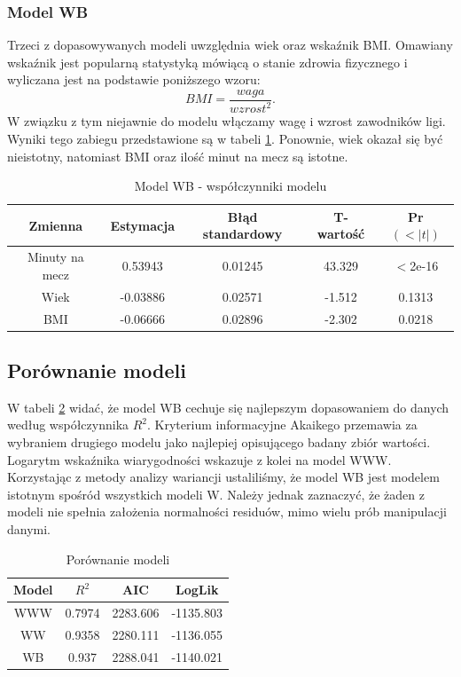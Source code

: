 \documentclass[11pt,a4paper]{article}
\begin{document}
\subsubsection{Model WB}
Trzeci z dopasowywanych modeli uwzględnia wiek oraz wskaźnik BMI. Omawiany wskaźnik jest popularną statystyką mówiącą o stanie zdrowia fizycznego i wyliczana jest na podstawie poniższego wzoru:
\begin{equation}
BMI = \frac{waga}{wzrost^2}.
\end{equation}
W związku z tym niejawnie do modelu włączamy wagę i wzrost zawodników ligi. Wyniki tego zabiegu przedstawione są w tabeli \ref{model_wb}. Ponownie, wiek okazał się być nieistotny, natomiast BMI oraz ilość minut na mecz są istotne.
\begin{table}[H]
	\begin{tabular}{| c | c | c | c | c |}
		\hline
		Zmienna & Estymacja & Błąd standardowy & T-wartość & Pr$(<|t|)$\\ \hline
		Minuty na mecz & 0.53943 & 0.01245 & 43.329 & $<$2e-16\\ \hline
		Wiek & -0.03886 & 0.02571 & -1.512 & 0.1313\\ \hline 
		BMI & -0.06666 & 0.02896 & -2.302 &  0.0218\\ \hline 	
	\end{tabular}
	\caption{Model WB - współczynniki modelu}
	\label{model_wb}
\end{table}
\subsection{Porównanie modeli}
W tabeli \ref{porownanie_modeli_w} widać, że model WB cechuje się najlepszym dopasowaniem do danych według współczynnika $R^2$. Kryterium informacyjne Akaikego przemawia za wybraniem drugiego modelu jako najlepiej opisującego badany zbiór wartości. Logarytm wskaźnika wiarygodności wskazuje z kolei na model WWW. Korzystając z metody analizy wariancji ustaliliśmy, że model WB jest modelem istotnym spośród wszystkich modeli W. Należy jednak zaznaczyć, że żaden z modeli nie spełnia założenia normalności residuów, mimo wielu prób manipulacji danymi.
\begin{table}[h]
	\begin{center}
		\begin{tabular}{| c | c | c | c |}
			\hline
			Model & $R^2$ & AIC & LogLik\\ \hline
			WWW & 0.7974 & 2283.606 & -1135.803\\ \hline
			WW & 0.9358  & 2280.111 & -1136.055 \\ \hline 
			WB & 0.937 & 2288.041 & -1140.021 \\ \hline  
		\end{tabular}
		\caption{Porównanie modeli}
		\label{porownanie_modeli_w}
	\end{center}
\end{table}
\end{document}
